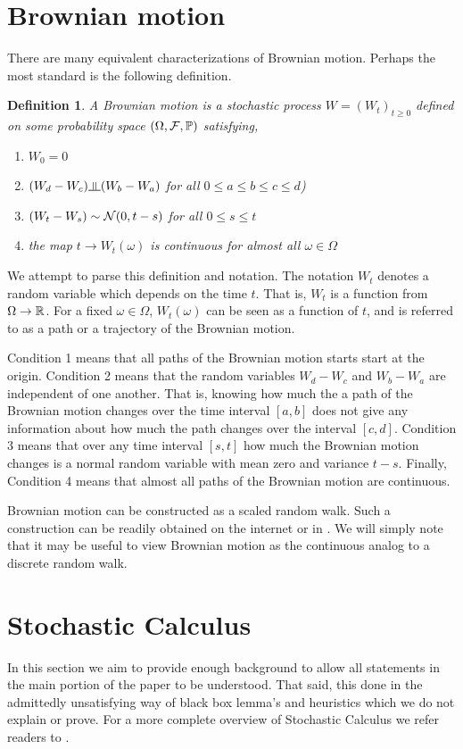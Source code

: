 \documentclass[12pt]{article}
\newtheorem*{definition}{Definition}
\begin{document}
\section{Brownian motion}
There are many equivalent characterizations of Brownian motion. Perhaps the most standard is the following definition.
\begin{definition}
A Brownian motion is a stochastic process \( W = (W_t)_{t\geq0} \) defined on some probability space \( (\Omega,\mathcal{F},\mathbb{P}) \) satisfying,
\begin{enumerate}[nolistsep]
    \item \( W_0 = 0 \)
    \item \( (W_d-W_c) \indep (W_b-W_a) \) for all \( 0\leq a\leq b\leq c\leq d \))
    \item \( (W_t - W_s) \sim \mathcal{N}(0,t-s) \) for all \( 0\leq s\leq t \)
    \item the map \( t \to W_t(\omega) \) is continuous for almost all \( \omega\in\Omega \)
\end{enumerate}
\end{definition}

We attempt to parse this definition and notation. The notation \( W_t \) denotes a random variable which depends on the time \( t \). That is, \( W_t \) is a function from \( \Omega \to \mathbb{R} \). For a fixed \( \omega \in \Omega \), \( W_t(\omega) \) can be seen as a function of \( t \), and is referred to as a path or a trajectory of the Brownian motion.

Condition 1 means that all paths of the Brownian motion starts start at the origin. Condition 2 means that the random variables \( W_d-W_c \) and \( W_b - W_a \) are independent of one another. That is, knowing how much the a path of the Brownian motion changes over the time interval \( [a,b] \) does not give any information about how much the path changes over the interval \( [c,d] \). Condition 3 means that over any time interval \( [s,t] \) how much the Brownian motion changes is a normal random variable with mean zero and variance \( t-s \). Finally, Condition 4 means that almost all paths of the Brownian motion are continuous.

Brownian motion can be constructed as a scaled random walk. Such a construction can be readily obtained on the internet or in \cite{lorig}. We will simply note that it may be useful to view Brownian motion as the continuous analog to a discrete random walk.

\section{Stochastic Calculus}
In this section we aim to provide enough background to allow all statements in the main portion of the paper to be understood. That said, this done in the admittedly unsatisfying way of black box lemma's and heuristics which we do not explain or prove. For a more complete overview of Stochastic Calculus we refer readers to \cite{kloeden, lorig}.
\end{document}
